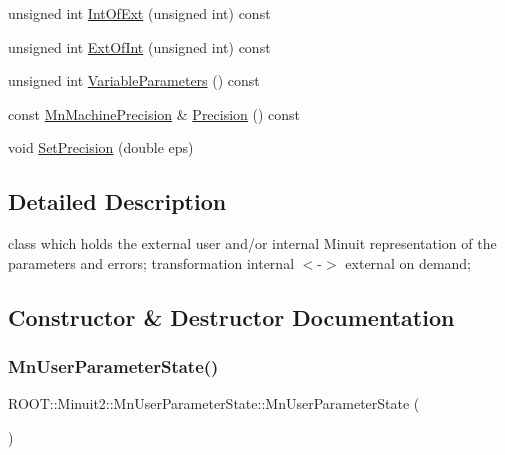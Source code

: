 \begin{DoxyCompactItemize}
\item 
unsigned int \mbox{\hyperlink{classROOT_1_1Minuit2_1_1MnUserParameterState_ab07f3ff917c70471b327243764aaad83}{Int\+Of\+Ext}} (unsigned int) const
\item 
unsigned int \mbox{\hyperlink{classROOT_1_1Minuit2_1_1MnUserParameterState_a9ab7bee2faaac9a607d090eb11926150}{Ext\+Of\+Int}} (unsigned int) const
\item 
unsigned int \mbox{\hyperlink{classROOT_1_1Minuit2_1_1MnUserParameterState_a8226cef71821d2558f31570f002631a4}{Variable\+Parameters}} () const
\item 
const \mbox{\hyperlink{classROOT_1_1Minuit2_1_1MnMachinePrecision}{Mn\+Machine\+Precision}} \& \mbox{\hyperlink{classROOT_1_1Minuit2_1_1MnUserParameterState_aff32da1a78b79f578541e42e91e37563}{Precision}} () const
\item 
void \mbox{\hyperlink{classROOT_1_1Minuit2_1_1MnUserParameterState_aab7787768e533471839387ef51a75cbb}{Set\+Precision}} (double eps)
\end{DoxyCompactItemize}


\subsection{Detailed Description}
class which holds the external user and/or internal Minuit representation of the parameters and errors; transformation internal $<$-\/$>$ external on demand; 

\subsection{Constructor \& Destructor Documentation}
\mbox{\label{classROOT_1_1Minuit2_1_1MnUserParameterState_aa327732c14a8771b3ae0cb5a67bba9f7}} 
\subsubsection{\texorpdfstring{MnUserParameterState()}{MnUserParameterState()}\hspace{0.1cm}{\footnotesize\ttfamily [1/24]}}
{\footnotesize\ttfamily R\+O\+O\+T\+::\+Minuit2\+::\+Mn\+User\+Parameter\+State\+::\+Mn\+User\+Parameter\+State (\begin{DoxyParamCaption}{ }\end{DoxyParamCaption})\hspace{0.3cm}{\ttfamily [inline]}}



